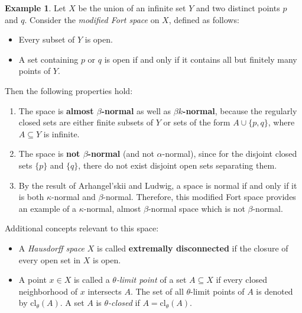 \documentclass[12pt,a4paper,twoside]{report}  %
\theoremstyle{plain}
\theoremstyle{definition}
\newtheorem{example}[theorem]{Example}
\begin{document}
\begin{example}
Let $X$ be the union of an infinite set $Y$ and two distinct points $p$ and $q$. Consider the \emph{modified Fort space}\cite{steen1978counterexamples} on $X$, defined as follows:

\begin{itemize}
    \item Every subset of $Y$ is open.
    \item A set containing $p$ or $q$ is open if and only if it contains all but finitely many points of $Y$.
\end{itemize}

\noindent Then the following properties hold:

\begin{enumerate}
    \item The space is \textbf{almost $\beta$-normal} as well as \textbf{$\beta k$-normal}, because the regularly closed sets are either finite subsets of $Y$ or sets of the form $A \cup \{p, q\}$, where $A \subseteq Y$ is infinite.
    
    \item The space is \textbf{not $\beta$-normal} (and not $\alpha$-normal), since for the disjoint closed sets $\{p\}$ and $\{q\}$, there do not exist disjoint open sets separating them.
    
    \item By the result of Arhangel’skii and Ludwig\cite{arhangelskii2001alpha}, a space is normal if and only if it is both $\kappa$-normal and $\beta$-normal. Therefore, this modified Fort space provides an example of a $\kappa$-normal, almost $\beta$-normal space which is not $\beta$-normal.
\end{enumerate}

\noindent Additional concepts relevant to this space:

\begin{itemize}
    \item A \emph{Hausdorff space} $X$ is called \textbf{extremally disconnected} if the closure of every open set in $X$ is open.
    
    \item A point $x \in X$ is called a \emph{$\theta$-limit point \cite{velicko1968hclosed}} of a set $A \subseteq X$ if every closed neighborhood of $x$ intersects $A$. The set of all $\theta$-limit points of $A$ is denoted by $\mathrm{cl}_\theta(A)$. A set $A$ is \emph{$\theta$-closed} if $A = \mathrm{cl}_\theta(A)$.
\end{itemize}

\end{example}
\end{document}
